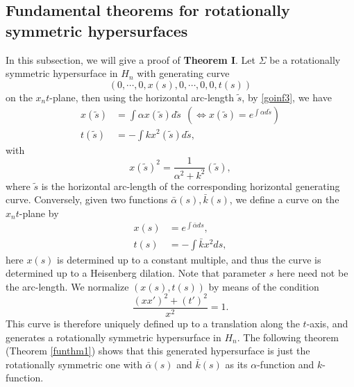 \documentclass[12pt]{amsart}
\theoremstyle{definition}\newtheorem{exa}[thm]{\sc Example}
\theoremstyle{definition}\newtheorem{de}[thm]{\sc Definition}
\theoremstyle{definition}\newtheorem{rem}[thm]{\sc Remark}
\theoremstyle{definition}\newtheorem{prob}[thm]{\it Problem}
\theoremstyle{definition}\newtheorem{fact}[thm]{\sc Fact}
\theoremstyle{definition}\newtheorem{claim}[thm]{\sc Claim}
\numberwithin{equation}{section}
\begin{document}
\subsection{Fundamental theorems for rotationally symmetric hypersurfaces}\label{ftrss} In this subsection, we will give a proof of {\bf Theorem I}.
Let $\Sigma$ be a rotationally symmetric hypersurface in $H_{n}$ with generating curve 
\[(0,\cdots,0,x(s),0,\cdots,0,0,t(s)) \] on the $x_{n}t$-plane, then using the horizontal arc-length $\tilde{s}$, by \eqref{goinf3}, we have 
\begin{equation}\label{regecu}
\begin{split}
x(\tilde{s})&=\int \alpha x(\tilde{s})d\tilde{s}\ \ \left(\Leftrightarrow x(\tilde{s})=e^{\int\alpha d\tilde{s}}\right)\\
t(\tilde{s})&=-\int kx^2(\tilde{s})d\tilde{s},
\end{split}
\end{equation}
with \[x(\tilde{s})^{2}=\frac{1}{\alpha^2+k^{2}}(\tilde{s}),\] where $\tilde{s}$ is the horizontal arc-length of the corresponding horizontal generating curve.
Conversely, given two functions $\bar\alpha(s),\bar{k}(s)$, we define a curve on the $x_{n}t$-plane by
\begin{equation}\label{regecu1}
\begin{split}
x(s)&=e^{\int\bar\alpha ds},\\
t(s)&=-\int \bar{k}x^2 ds,
\end{split}
\end{equation}
here $x(s)$ is determined up to a constant multiple, and thus the curve is determined up to a Heisenberg dilation. Note that parameter $s$ here need not be the arc-length. We normalize $(x(s),t(s))$ by means of the condition
\begin{equation}\label{nomal}
\frac{(xx')^{2}+(t')^2}{x^2}=1.
\end{equation}
This curve is therefore uniquely defined up to a translation along the $t$-axis, and generates a rotationally symmetric hypersurface in $H_{n}$. The following theorem (Theorem \ref{funthm1}) shows that this generated hypersurface is just the rotationally symmetric one with $\bar\alpha(s)$ and $\bar{k}(s)$ as its $\alpha$-function and $k$-function.
\end{document}
